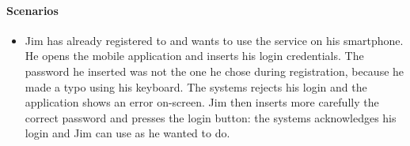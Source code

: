 \paragraph{Scenarios}
\begin{itemize}
	\item Jim has already registered to \myTaxiService{} and wants to use the service on his smartphone.
	He opens the mobile application and inserts his login credentials.
	The password he inserted was not the one he chose during registration, because he made a typo using his keyboard.
	The systems rejects his login and the application shows an error on-screen.
	Jim then inserts more carefully the correct password and presses the login button: the systems acknowledges his login and Jim can use \myTaxiService{} as he wanted to do.
\end{itemize}
